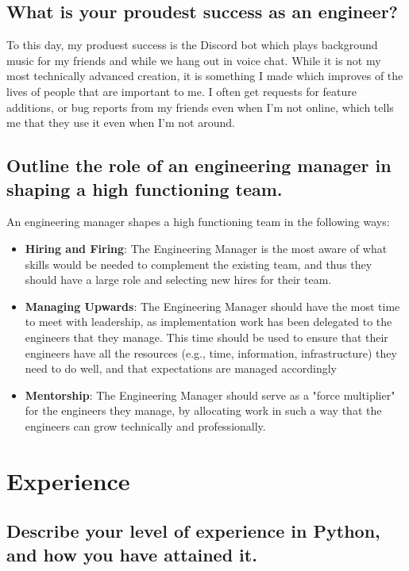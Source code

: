 \documentclass{article}
\begin{document}
\subsection{What is your proudest success as an engineer?}

To this day, my produest success is the Discord bot which plays background music
for my friends and while we hang out in voice chat. While it is not my most
technically advanced creation, it is something I made which improves of the
lives of people that are important to me. I often get requests for
feature additions, or bug reports from my friends even when I'm not online,
which tells me that they use it even when I'm not around.

\subsection{Outline the role of an engineering manager in shaping a high
    functioning team.}

An engineering manager shapes a high functioning team in the following ways:
\begin{itemize}
    \item \textbf{Hiring and Firing}: The Engineering Manager is the most aware
          of what skills would be needed to complement the existing team, and thus
          they should have a large role and selecting new hires for their team.
    \item \textbf{Managing Upwards}: The Engineering Manager should have the
          most time to meet with leadership, as implementation work has been delegated
          to the engineers that they manage. This time should be used to ensure that their
          engineers have all the resources (e.g., time, information, infrastructure) they
          need to do well, and that expectations are managed accordingly
    \item \textbf{Mentorship}: The Engineering Manager should serve as a "force
          multiplier" for the engineers they manage, by allocating work in such a way
          that the engineers can grow technically and professionally.
\end{itemize}

\section{Experience} \subsection{Describe your level of experience in Python,
    and how you have attained it.}
\end{document}
